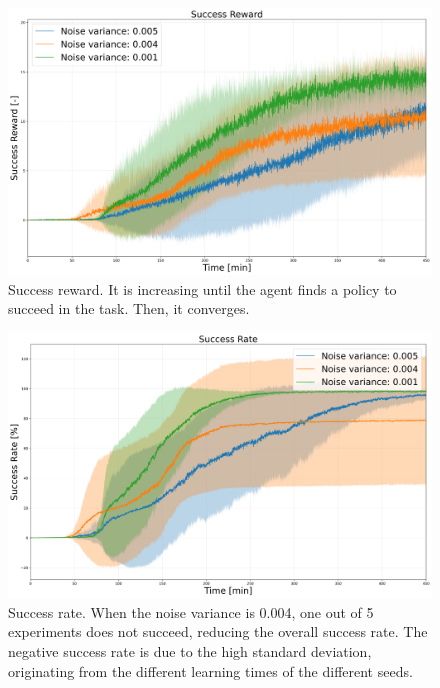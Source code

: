 \documentclass[a4paper]{article}
\begin{document}
\newpage
\begin{figure}[!hb]
    \centering
    \includegraphics[scale=0.3]{images/Success Rewardv3.png}
    \caption{Success reward. It is increasing until the agent finds a policy to succeed in the task. Then, it converges.}
\end{figure}

\vspace{2cm}

\begin{figure}[!hb]
    \centering
    \includegraphics[scale=0.3]{images/Success Ratev3.png}
    \caption{Success rate. When the noise variance is 0.004, one out of 5 experiments does not succeed, reducing the overall success rate. The negative success rate is due to the high standard deviation, originating from the different learning times of the different seeds.}
\end{figure}
\end{document}

